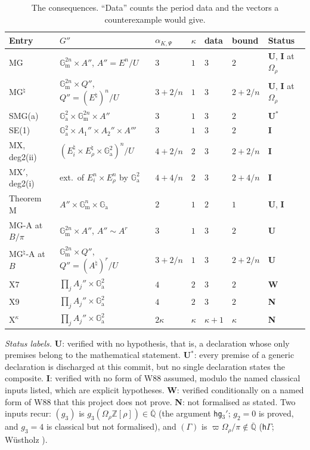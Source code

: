 \documentclass[11pt]{amsart}
\theoremstyle{definition}
\theoremstyle{remark}
\numberwithin{equation}{section}
\newcommand{\ZZ}{\mathbb{Z}}
\newcommand{\Qbar}{\overline{\mathbb{Q}}}
\newcommand{\Ga}{\mathbb{G}_{\mathrm{a}}}
\newcommand{\Gm}{\mathbb{G}_{\mathrm{m}}}
\newcommand{\vp}{\varpi}
\begin{document}
\begin{table}[ht]\footnotesize
\begin{tabular}{@{}lllllll@{}}
\toprule
Entry & $G''$ & $\alpha_{K,\Psi}$ & $\kappa$ & data & bound & Status \\
\midrule
MG & $\Gm^{2n}\times A''$, $A''=E^n/U$ & $3$ & $1$ & $3$ & $2$ & \textbf{U}, \textbf{I} at $\Omega_\rho$ \\
MG$^\natural$ & $\Gm^{2n}\times Q''$, $Q''=(E^\natural)^n/U$ & $3+2/n$ & $1$ & $3$ & $2+2/n$ & \textbf{U}, \textbf{I} at $\Omega_\rho$ \\
SMG(a) & $\Ga^2\times\Gm^{2n}\times A''$ & $3$ & $1$ & $3$ & $2$ & \textbf{U}$^*$ \\
SE(1) & $\Ga^2\times A_1''\times A_2''\times A'''$ & $3$ & $1$ & $3$ & $2$ & \textbf{I} \\
MX, deg2(ii) & $(E_i^\natural\times E_\rho^\natural\times\Ga^2)^n/U$ & $4+2/n$ & $2$ & $3$ & $2+2/n$ & \textbf{I} \\
MX$'$, deg2(i) & ext.~of $E_i^n\times E_\rho^n$ by $\Ga^2$ & $4+4/n$ & $2$ & $3$ & $2+4/n$ & \textbf{I} \\
Theorem M & $A''\times\Gm^n\times\Ga$ & $2$ & $1$ & $2$ & $1$ & \textbf{U}, \textbf{I} \\
MG-A at $B/\pi$ & $\Gm^{2n}\times A''$, $A''\sim A^r$ & $3$ & $1$ & $3$ & $2$ & \textbf{U} \\
MG$^\natural$-A at $B$ & $\Gm^{2n}\times Q''$, $Q''=(A^\natural)^r/U$ & $3+2/n$ & $1$ & $3$ & $2+2/n$ & \textbf{U} \\
X7 & $\prod_jA_j''\times\Ga^2$ & $4$ & $2$ & $3$ & $2$ & \textbf{W} \\
X9 & $\prod_jA_j''\times\Ga^2$ & $4$ & $2$ & $3$ & $2$ & \textbf{N} \\
X$^\kappa$ & $\prod_jA_j''\times\Ga^2$ & $2\kappa$ & $\kappa$ & $\kappa+1$ & $\kappa$ & \textbf{N} \\
\bottomrule
\end{tabular}
\caption{The consequences. ``Data'' counts the period data and the vectors a counterexample would give.}\label{tab:conseq}
\end{table}

\emph{Status labels.} \textbf{U}: verified with no hypothesis, that is, a declaration whose only premises belong to the
mathematical statement. \textbf{U}$^*$: every premise of a generic declaration is discharged at this commit, but no single
declaration states the composite. \textbf{I}: verified with no form of W88 assumed, modulo the named classical inputs listed,
which are explicit hypotheses. \textbf{W}: verified conditionally on a named form of W88 that this project does not prove.
\textbf{N}: not formalised as
stated. Two inputs recur: $(g_3)$ is $g_3(\Omega_\rho\ZZ[\rho])\in\Qbar$ (the argument \texttt{hg$_3'$}; $g_2=0$ is proved, and
$g_3=4$ is classical but not formalised), and $(\Gamma)$ is $\vp\Omega_\rho/\pi\notin\Qbar$ (\texttt{h$\Gamma$};
W\"ustholz \cite{Wustholz1989}).
\end{document}
